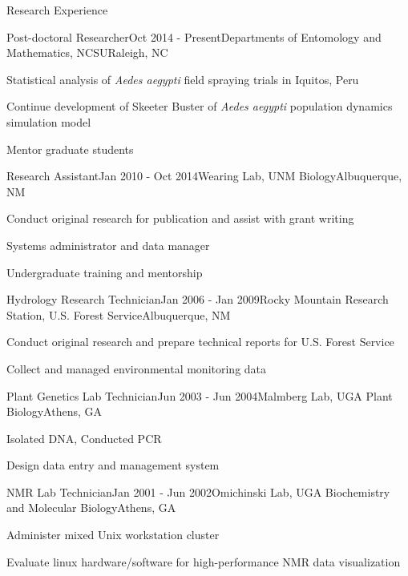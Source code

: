 \documentclass{resume} %
\begin{document}
\begin{rSection}{Research Experience}

\begin{rSubsection}{Post-doctoral Researcher}{Oct 2014 - Present}{Departments of
Entomology and Mathematics, NCSU}{Raleigh, NC}
\item Statistical analysis of {\em Aedes aegypti} field spraying trials in Iquitos, Peru
\item Continue development of Skeeter Buster of {\em Aedes aegypti} population dynamics simulation model
\item Mentor graduate students
\end{rSubsection}

\begin{rSubsection}{Research Assistant}{Jan 2010 - Oct 2014}{Wearing Lab, UNM Biology}{Albuquerque, NM}
\item Conduct original research for publication and assist with grant writing
\item Systems administrator and data manager
\item Undergraduate training and mentorship
\end{rSubsection}

\begin{rSubsection}{Hydrology Research Technician}{Jan 2006 - Jan 2009}{Rocky
Mountain Research Station, U.S. Forest Service}{Albuquerque, NM}
\item Conduct original research and prepare technical reports for U.S. Forest Service
\item Collect and managed environmental monitoring data 
\end{rSubsection}

\begin{rSubsection}{Plant Genetics Lab Technician}{Jun 2003 - Jun 2004}{Malmberg Lab, UGA Plant Biology}{Athens, GA}
\item Isolated DNA, Conducted PCR
\item Design data entry and management system
\end{rSubsection}

\begin{rSubsection}{NMR Lab Technician}{Jan 2001 - Jun 2002}{Omichinski Lab, UGA
Biochemistry and Molecular Biology}{Athens, GA}
\item Administer mixed Unix workstation cluster
\item Evaluate linux hardware/software for high-performance NMR data visualization
\end{rSubsection}
\end{rSection}
\end{document}
